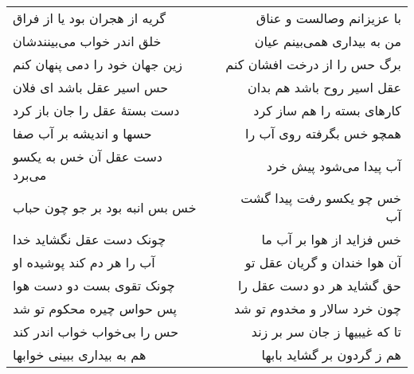 \begin{center}
\begin{longtable}{l p{0.5cm} r}
گریه از هجران بود یا از فراق
&&
با عزیزانم وصالست و عناق
\\
خلق اندر خواب می‌بینندشان
&&
من به بیداری همی‌بینم عیان
\\
زین جهان خود را دمی پنهان کنم
&&
برگ حس را از درخت افشان کنم
\\
حس اسیر عقل باشد ای فلان
&&
عقل اسیر روح باشد هم بدان
\\
دست بستهٔ عقل را جان باز کرد
&&
کارهای بسته را هم ساز کرد
\\
حسها و اندیشه بر آب صفا
&&
همچو خس بگرفته روی آب را
\\
دست عقل آن خس به یکسو می‌برد
&&
آب پیدا می‌شود پیش خرد
\\
خس بس انبه بود بر جو چون حباب
&&
خس چو یکسو رفت پیدا گشت آب
\\
چونک دست عقل نگشاید خدا
&&
خس فزاید از هوا بر آب ما
\\
آب را هر دم کند پوشیده او
&&
آن هوا خندان و گریان عقل تو
\\
چونک تقوی بست دو دست هوا
&&
حق گشاید هر دو دست عقل را
\\
پس حواس چیره محکوم تو شد
&&
چون خرد سالار و مخدوم تو شد
\\
حس را بی‌خواب خواب اندر کند
&&
تا که غیبیها ز جان سر بر زند
\\
هم به بیداری ببینی خوابها
&&
هم ز گردون بر گشاید بابها
\\
\end{longtable}
\end{center}
